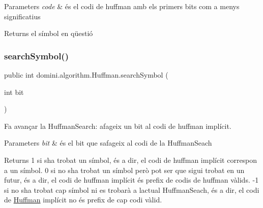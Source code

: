 \begin{DoxyParams}{Parameters}
{\em code} & és el codi de huffman amb els primers bits com a menys significatius \\
\hline
\end{DoxyParams}
\begin{DoxyReturn}{Returns}
el símbol en qüestió 
\end{DoxyReturn}
\mbox{\label{classdomini_1_1algorithm_1_1Huffman_a56a954cb68aad6701b609d0fc2c7c724}} 
\subsubsection{\texorpdfstring{search\+Symbol()}{searchSymbol()}}
{\footnotesize\ttfamily public int domini.\+algorithm.\+Huffman.\+search\+Symbol (\begin{DoxyParamCaption}\item[{int}]{bit }\end{DoxyParamCaption})\hspace{0.3cm}{\ttfamily [inline]}}



Fa avançar la Huffman\+Search\+: afageix un bit al codi de huffman implícit. 


\begin{DoxyParams}{Parameters}
{\em bit} & és el bit que s\textquotesingle{}afageix al codi de la Huffman\+Seach \\
\hline
\end{DoxyParams}
\begin{DoxyReturn}{Returns}
1 si s\textquotesingle{}ha trobat un símbol, és a dir, el codi de huffman implícit correspon a un símbol. 0 si no s\textquotesingle{}ha trobat un símbol però pot ser que sigui trobat en un futur, és a dir, el codi de huffman implícit és prefix de codis de huffman vàlids. -\/1 si no s\textquotesingle{}ha trobat cap símbol ni es trobarà a l\textquotesingle{}actual Huffman\+Seach, és a dir, el codi de \hyperlink{classdomini_1_1algorithm_1_1Huffman}{Huffman} implícit no és prefix de cap codi vàlid. 
\end{DoxyReturn}
\mbox{\label{classdomini_1_1algorithm_1_1Huffman_a2c035fb63cf7b945bc56cca90c1343a3}} 
